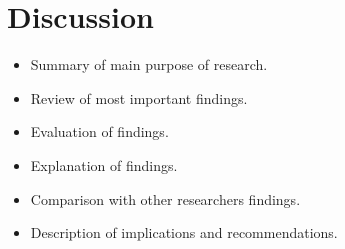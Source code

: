 \documentclass{sigchi}
\begin{document}

\section{Discussion} %
\label{sec:discussion}
\begin{itemize}
  \item Summary of main purpose of research.
  \item Review of most important findings.
  \item Evaluation of findings.
  \item Explanation of findings.
  \item Comparison with other researchers findings.
  \item Description of implications and recommendations.
\end{itemize}





\end{document}
